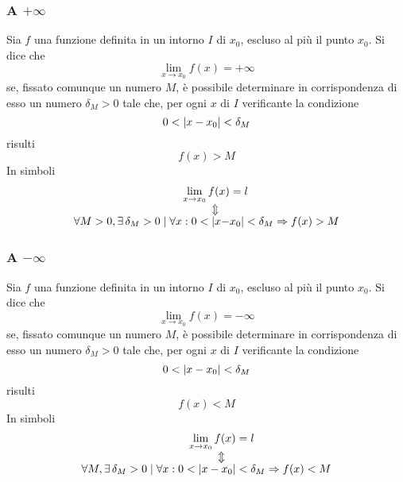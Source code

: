 \subsubsection{A $+\infty$}
\begin{definizioneLimiteInfinito1}
  Sia $f$ una funzione definita in un intorno $I$ di $x_0$, escluso al più il punto $x_0$. Si dice
  che
  \begin{equation*}
    \lim\limits_{x\to x_0}f(x)=+\infty
  \end{equation*}
  se, fissato comunque un numero $M$, è possibile determinare in corrispondenza di esso un numero
  $\delta_M>0$ tale che, per ogni $x$ di $I$ verificante la condizione
  \begin{equation*}
    0<\lvert x-x_0\rvert<\delta_M
  \end{equation*}
  risulti
  \begin{equation*}
    f(x)>M
  \end{equation*}
  In simboli
  \begin{align*}
    \lim\limits_{x\to x_0} f(x) &= l\\
    \ArrowBetweenLines
    \forall M>0, \exists\,\delta_M>0\mid\forall x: 0<\vert x-&x_0\vert < \delta_M \Rightarrow
    f(x) > M
  \end{align*}
\end{definizioneLimiteInfinito1}
\subsubsection{A $-\infty$}
\begin{definizioneLimiteInfinito2}
  Sia $f$ una funzione definita in un intorno $I$ di $x_0$, escluso al più il punto $x_0$. Si dice
  che
  \begin{equation*}
    \lim\limits_{x\to x_0}f(x)=-\infty
  \end{equation*}
  se, fissato comunque un numero $M$, è possibile determinare in corrispondenza di esso un numero
  $\delta_M>0$ tale che, per ogni $x$ di $I$ verificante la condizione
  \begin{equation*}
    0<\lvert x-x_0\rvert<\delta_M
  \end{equation*}
  risulti
  \begin{equation*}
    f(x)<M
  \end{equation*}
  In simboli
  \begin{align*}
    \lim\limits_{x\to x_0} f(x) &= l\\
    \ArrowBetweenLines
    \forall M, \exists\,\delta_M>0\mid\forall x: 0<\vert x-x_0\vert &< \delta_M \Rightarrow
    f(x) < M
  \end{align*}
\end{definizioneLimiteInfinito2}

